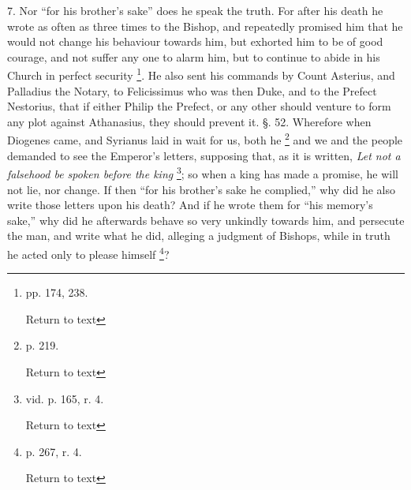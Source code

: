 7. Nor ``for his brother's sake'' does he
speak the truth. For after his death he wrote as often as three times
to the Bishop, and repeatedly promised him that he would not change
his behaviour towards him, but exhorted him to be of good courage, and
not suffer any one to alarm him, but to continue to abide in his
Church in perfect security \footnote{pp. 174, 238.

Return to text}. He also sent his commands by
Count Asterius, and Palladius the Notary, to Felicissimus who was then
Duke, and to the Prefect Nestorius, that if either Philip the Prefect,
or any other should venture to form any plot against Athanasius, they
should prevent it. §. 52. Wherefore when Diogenes came, and Syrianus laid in
wait for us, both he \footnote{p. 219.

Return to text} and we and the people demanded to see
the Emperor's letters, supposing that, as it is written, \emph{Let not
a falsehood be spoken before the king} \footnote{vid. p. 165, r. 4.

Return to text}; so when a king
has made a promise, he will not lie, nor change. If then ``for his
brother's sake he complied,'' why did he also write those letters
upon his death? And if he wrote them for ``his memory's sake,''
why did he afterwards behave so very unkindly towards him, and
persecute the man, and write what he did, alleging a judgment of
Bishops, while in truth he acted only to please himself \footnote{p. 267, r. 4.

Return to text}?

